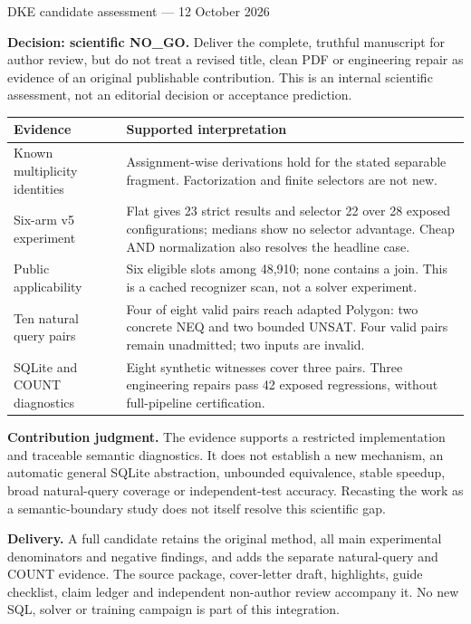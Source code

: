 \documentclass[10pt]{article}
\begin{document}
\par
\smallskip
\noindent DKE candidate assessment --- 12 October 2026

\noindent\textbf{Decision: scientific NO\_GO.} Deliver the complete, truthful manuscript for author review, but do not treat a revised title, clean PDF or engineering repair as evidence of an original publishable contribution. This is an internal scientific assessment, not an editorial decision or acceptance prediction.

\noindent\begin{tabularx}{\textwidth}{p{}X}
\toprule
Evidence & Supported interpretation\\
\midrule
Known multiplicity identities & Assignment-wise derivations hold for the stated separable fragment. Factorization and finite selectors are not new.\\
Six-arm v5 experiment & Flat gives 23 strict results and selector 22 over 28 exposed configurations; medians show no selector advantage. Cheap AND normalization also resolves the headline case.\\
Public applicability & Six eligible slots among 48,910; none contains a join. This is a cached recognizer scan, not a solver experiment.\\
Ten natural query pairs & Four of eight valid pairs reach adapted Polygon: two concrete NEQ and two bounded UNSAT. Four valid pairs remain unadmitted; two inputs are invalid.\\
SQLite and COUNT diagnostics & Eight synthetic witnesses cover three pairs. Three engineering repairs pass 42 exposed regressions, without full-pipeline certification.\\
\bottomrule
\end{tabularx}

\noindent\textbf{Contribution judgment.} The evidence supports a restricted implementation and traceable semantic diagnostics. It does not establish a new mechanism, an automatic general SQLite abstraction, unbounded equivalence, stable speedup, broad natural-query coverage or independent-test accuracy. Recasting the work as a semantic-boundary study does not itself resolve this scientific gap.

\noindent\textbf{Delivery.} A full candidate retains the original method, all main experimental denominators and negative findings, and adds the separate natural-query and COUNT evidence. The source package, cover-letter draft, highlights, guide checklist, claim ledger and independent non-author review accompany it. No new SQL, solver or training campaign is part of this integration.
\end{document}
